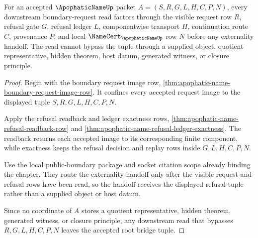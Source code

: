 \begin{theorem}
\label{thm:apophatic-name-root-bridge-tuple-visible-request-factorization}
For an accepted $\ApophaticNameUp$ packet $A=(S,R,G,L,H,C,P,N)$, every downstream boundary-request read factors through the visible request row $R$, refusal gate $G$, refusal ledger $L$, componentwise transport $H$, continuation route $C$, provenance $P$, and local $\NameCert_{\ApophaticNameUp}$ row $N$ before any externality handoff. The read cannot bypass the tuple through a supplied object, quotient representative, hidden theorem, host datum, generated witness, or closure principle.
\end{theorem}
\begin{proof}
Begin with the boundary request image row, \autoref{thm:apophatic-name-boundary-request-image-row}. It confines every accepted request image to the displayed tuple $S,R,G,L,H,C,P,N$.

Apply the refusal readback and ledger exactness rows, \autoref{thm:apophatic-name-refusal-readback-row} and \autoref{thm:apophatic-name-refusal-ledger-exactness}. The readback returns each accepted image to its corresponding finite component, while exactness keeps the refusal decision and replay rows inside $G,L,H,C,P,N$.

Use the local public-boundary package and socket citation scope already binding the chapter. They route the externality handoff only after the visible request and refusal rows have been read, so the handoff receives the displayed refusal tuple rather than a supplied object or host datum.

Since no coordinate of $A$ stores a quotient representative, hidden theorem, generated witness, or closure principle, any downstream read that bypasses $R,G,L,H,C,P,N$ leaves the accepted root bridge tuple.
\end{proof}

